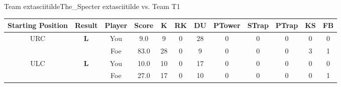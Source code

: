 \documentclass[a4paper,12pt]{article}
\begin{document}
  \vspace*{2em}
  \par {\large {\color{Gray} Team} 	extasciitildeThe\_Specter	extasciitilde {\color{Gray}
      vs. Team} T1}
  \newline
  \begin{tabular}[t]{| c | c | c | c | c | c | c | c | c | c | c | c
      |}
    \hline
    Starting Position & \textbf{Result} & Player & \textbf{Score} & K & RK & DU & PTower & STrap & PTrap & KS & FB \\
    
      
                      
      
                      
      
                      
      
        \hline
        \multirow{2}{*}{  URC
             } &
              \multirow{2}{*}{  \textbf{L}  } & 
                    \cellcolor{yellow!25} You & \cellcolor{yellow!25} 9.0 & \cellcolor{yellow!25} 9 &
                    \cellcolor{yellow!25} 0 & \cellcolor{yellow!25} 28 & \cellcolor{yellow!25} 0 &
                    \cellcolor{yellow!25} 0 & \cellcolor{yellow!25} 0 & \cellcolor{yellow!25} 0 &
                    \cellcolor{yellow!25} 0 \\
                    \cline{3-12}
                    & & \cellcolor{red!15} Foe & \cellcolor{red!15} 83.0 & \cellcolor{red!15} 28 & \cellcolor{red!15}
                    0 & \cellcolor{red!15} 9
                    & \cellcolor{red!15} 0 & \cellcolor{red!15}
                    0 & \cellcolor{red!15} 0 
                    & \cellcolor{red!15} 3 & \cellcolor{red!15}
                    1 \\
                    
                      
      
                      
      
                      
      
                      
      
        \hline
        \multirow{2}{*}{  ULC  } &
              \multirow{2}{*}{  \textbf{L}  } & 
                    \cellcolor{yellow!25} You & \cellcolor{yellow!25} 10.0 & \cellcolor{yellow!25} 10 &
                    \cellcolor{yellow!25} 0 & \cellcolor{yellow!25} 17 & \cellcolor{yellow!25} 0 &
                    \cellcolor{yellow!25} 0 & \cellcolor{yellow!25} 0 & \cellcolor{yellow!25} 0 &
                    \cellcolor{yellow!25} 0 \\
                    \cline{3-12}
                    & & \cellcolor{red!15} Foe & \cellcolor{red!15} 27.0 & \cellcolor{red!15} 17 & \cellcolor{red!15}
                    0 & \cellcolor{red!15} 10
                    & \cellcolor{red!15} 0 & \cellcolor{red!15}
                    0 & \cellcolor{red!15} 0 
                    & \cellcolor{red!15} 0 & \cellcolor{red!15}
                    1 \\
                    

\end{tabular}
\end{document}
